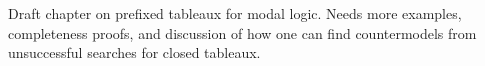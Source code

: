 \documentclass[../../../include/open-logic-chapter]{subfiles}
\begin{document}

\begin{editorial}
  Draft chapter on prefixed tableaux for modal logic. Needs more
  examples, completeness proofs, and discussion of how one can find
  countermodels from unsuccessful searches for closed tableaux.
\end{editorial}










\OLEndChapterHook
\end{document}

